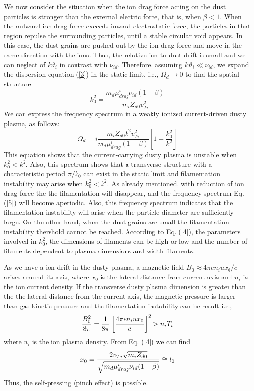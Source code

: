 We now consider the situation when the ion drag force acting on the
dust particles is stronger than the external electric force, that
is, when ${\beta}<1$. When the outward ion drag force exceeds inward
electrostatic force, the particles in that region repulse the
surrounding particles, until a stable circular void appears. In this
case, the dust grains are pushed out by the ion drag force and move
in the same direction with the ions. Thus, the relative ion-to-dust
drift is small and we can neglect of $k\vartheta_{i}$ in contrast
with $\nu_{id}$. Therefore, assuming $k\vartheta_{i}\ll \nu_{id}$,
we expand the dispersion equation (\ref{3}) in the static limit,
i.e., $\Omega_{d} \rightarrow 0$ to find the spatial structure
\begin{equation}\label{11}
k_{0}^{2}=\frac{m_{d}\mu_{drag}^{i}\nu_{id}(1-\beta)}{m_{i}Z_{d0}v_{Ti}^{2}}
\end{equation}
We can express the frequency spectrum in a weakly ionized
current-driven dusty plasma, as follows:
\begin{equation}\label{12}
\Omega_{d}=i\frac{m_{i}Z_{d0}k^{2}v_{Ti}^{2}}{m_{d}\mu_{drag}^{i}(1-\beta)}\left[ 1-\frac{k_{0}^2}{k^2}\right]
\end{equation}
This equation shows that the current-carrying dusty plasma is
unstable when $k_{0}^2<k^2$. Also, this spectrum shows that a
transverse structure with a characteristic period $\pi/k_0$ can
exist in the static limit and filamentation instability may arise
when $k_{0}^2<k^2$. As already mentioned, with reduction of ion drag
force the the filamentation will disappear, and the frequency
spectrum Eq. (\ref{5}) will become aperiodic. Also, this frequency
spectrum indicates that the filamentation instability will arise
when the particle diameter are sufficiently large. On the other
hand, when the dust grains are small the filamentation instability
thershold cannot be reached. According to Eq. (\ref{4}), the
parameters involved in $k_{0}^2$, the dimensions of filaments can be
high or low and the number of filaments dependent to plasma
dimensions and width filaments.

As we have a ion drift in the dusty plasma, a magnetic field
$B_{0}\approx 4\pi e n_{i}ux_{0}/c$ arises around its axis, where
$x_{0}$ is the lateral distance from current axis and $n_{i}$ is the
ion current density. If the transverse dusty plasma dimension is
greater than the the lateral distance from the current axis, the
magnetic pressure is larger than gas kinetic pressure and the
filamentation instability can be result i.e.,
\begin{equation}{\label{13}}
\frac{B_{0}^{2}}{8\pi}=\frac{1}{8\pi}\left[\frac{4\pi e n_{i} u
x_{0}}{c}\right]^{2} > n_{i}T_{i}
\end{equation}
where $n_{i}$ is the ion plasma density. From Eq. (\ref{4}) we can find
\begin{equation}{\label{14}}
x_{0} =\frac{2v_{Ti}\sqrt{m_{i}Z_{d0}}}{\sqrt{m_{d}\mu_{drag}^{i}\nu_{id}(1-\beta)}}\cong l_{0}
\end{equation}
Thus, the self-pressing (pinch effect) is possible.


